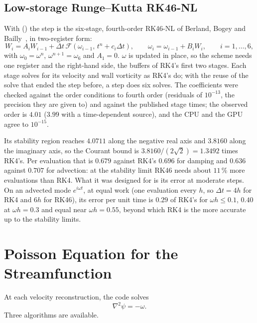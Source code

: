 \documentclass[11pt,a4paper]{article}
\newcommand{\dt}{\Delta t}
\newcommand{\code}[1]{\texttt{\detokenize{#1}}}
\begin{document}
\subsection{Low-storage Runge--Kutta RK46-NL}
\label{sec:rk46}

With \code{time_scheme = 4} (\code{--time-scheme rk46}) the step is the six-stage, fourth-order RK46-NL of Berland, Bogey and Bailly~\cite{berland2006}, in two-register form:
\begin{equation}
W_i=A_iW_{i-1}+\dt\,\mathcal{F}(\omega_{i-1},\,t^n+c_i\dt),\qquad \omega_i=\omega_{i-1}+B_iW_i,\qquad i=1,\dots,6,
\end{equation}
with $\omega_0=\omega^n$, $\omega^{n+1}=\omega_6$ and $A_1=0$.  $\omega$ is updated in place, so the scheme needs one register and the right-hand side, the buffers of RK4's first two stages.  Each stage solves for its velocity and wall vorticity as RK4's do; with the reuse of the solve that ended the step before, a step does six solves.  The coefficients were checked against the order conditions to fourth order (residuals of $10^{-13}$, the precision they are given to) and against the published stage times; the observed order is $4.01$ ($3.99$ with a time-dependent source), and the CPU and the GPU agree to $10^{-15}$.

Its stability region reaches $4.0711$ along the negative real axis and $3.8160$ along the imaginary axis, so the Courant bound is $3.8160/(2\sqrt2)=1.3492$ times RK4's.  Per evaluation that is $0.679$ against RK4's $0.696$ for damping and $0.636$ against $0.707$ for advection: at the stability limit RK46 needs about $11\,\%$ more evaluations than RK4.  What it was designed for is its error at moderate steps.  On an advected mode $e^{i\omega t}$, at equal work (one evaluation every $h$, so $\dt=4h$ for RK4 and $6h$ for RK46), its error per unit time is $0.29$ of RK4's for $\omega h\le0.1$, $0.40$ at $\omega h=0.3$ and equal near $\omega h=0.55$, beyond which RK4 is the more accurate up to the stability limits.

\section{Poisson Equation for the Streamfunction}

At each velocity reconstruction, the code solves
\begin{equation}
\nabla^2\psi=-\omega.
\end{equation}
Three algorithms are available.
\end{document}
